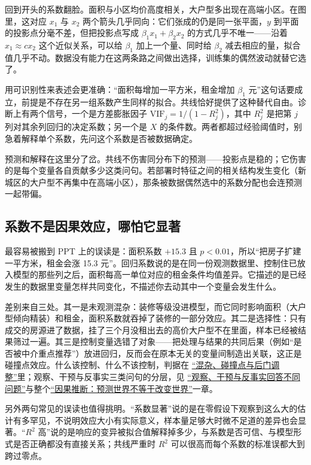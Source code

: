 回到开头的系数翻脸。面积与小区均价高度相关，大户型多出现在高端小区。在图里，这对应 \(x_1\) 与 \(x_2\) 两个箭头几乎同向：它们张成的仍是同一张平面，\(y\) 到平面的投影点分毫不差，但把投影点写成 \(\beta_1x_1+\beta_2x_2\) 的方式几乎不唯一——沿着 \(x_1\approx cx_2\) 这个近似关系，可以给 \(\beta_1\) 加上一个量、同时给 \(\beta_2\) 减去相应的量，拟合值几乎不动。数据没有能力在这两条路之间做出选择，训练集的偶然波动就替它选了。

用可识别性来表述会更准确：``面积每增加一平方米，租金增加 \(\beta_1\) 元''这句话要成立，前提是不存在另一组系数产生同样的拟合。共线恰好提供了这种替代自由。诊断上有两个信号，一个是方差膨胀因子 \(\mathrm{VIF}_j=1/(1-R_j^2)\)，其中 \(R_j^2\) 是把第 \(j\) 列对其余列回归的决定系数；另一个是 \(X\) 的条件数。两者都超过经验阈值时，别急着解释单个系数，先问这个系数是否被数据确定。

预测和解释在这里分了岔。共线不伤害同分布下的预测——投影点是稳的；它伤害的是每个变量各自贡献多少这类问句。若部署时特征之间的相关结构发生变化（新城区的大户型不再集中在高端小区），那条被数据偶然选中的系数分配也会连预测一起带偏。

\subsection{系数不是因果效应，哪怕它显著}

最容易被搬到 PPT 上的误读是：面积系数 \(+15.3\) 且 \(p<0.01\)，所以``把房子扩建一平方米，租金会涨 15.3 元''。回归系数说的是在同一份观测数据里、控制住已放入模型的那些列之后，面积每高一单位对应的租金条件均值差异。它描述的是已经发生的数据里变量怎样共同变化，不描述你去动其中一个变量会发生什么。

差别来自三处。其一是未观测混杂：装修等级没进模型，而它同时影响面积（大户型倾向精装）和租金，面积系数就吞掉了装修的一部分效应。其二是选择性：只有成交的房源进了数据，挂了三个月没租出去的高价大户型不在里面，样本已经被结果筛过一遍。其三是控制变量选错了对象——把处理与结果的共同后果（例如``是否被中介重点推荐''）放进回归，反而会在原本无关的变量间制造出关联，这正是碰撞点效应。什么该控制、什么不该控制，判据在 \hyperref[sec:13-Machine-Learning/12-Causal-Inference/03]{``混杂、碰撞点与后门调整''}里；观察、干预与反事实三类问句的分层，见 \hyperref[sec:13-Machine-Learning/12-Causal-Inference/01]{``观察、干预与反事实回答不同问题''}与整个\hyperref[ch:120]{``因果推断：预测世界不等于改变世界''}一章。

另外两句常见的误读也值得挑明。``系数显著''说的是在零假设下观察到这么大的估计有多罕见，不说明效应大小有实际意义，样本量足够大时微不足道的差异也会显著。``\(R^2\) 高''说的是响应的变异被拟合值解释掉多少，与系数是否可信、与模型形式是否正确都没有直接关系；共线严重时 \(R^2\) 可以很高而每个系数的标准误都大到跨过零点。

